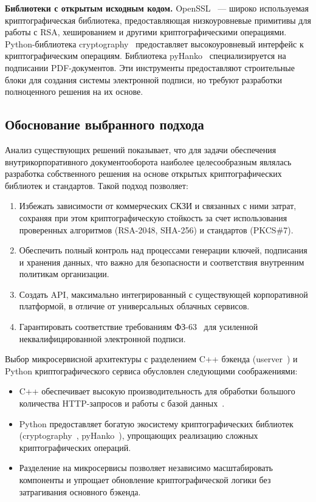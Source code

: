 \documentclass[a4paper,12pt]{extarticle}
\begin{document}
\textbf{Библиотеки с открытым исходным кодом.} OpenSSL~\cite{openssl} --- широко используемая криптографическая библиотека, предоставляющая низкоуровневые примитивы для работы с RSA, хешированием и другими криптографическими операциями. Python-библиотека cryptography~\cite{cryptography_python} предоставляет высокоуровневый интерфейс к криптографическим операциям. Библиотека pyHanko~\cite{pyhanko} специализируется на подписании PDF-документов. Эти инструменты предоставляют строительные блоки для создания системы электронной подписи, но требуют разработки полноценного решения на их основе.

\subsection{Обоснование выбранного подхода}

Анализ существующих решений показывает, что для задачи обеспечения внутрикорпоративного документооборота наиболее целесообразным являлась разработка собственного решения на основе открытых криптографических библиотек и стандартов. Такой подход позволяет:

\begin{enumerate}
    \item Избежать зависимости от коммерческих СКЗИ и связанных с ними затрат, сохраняя при этом криптографическую стойкость за счет использования проверенных алгоритмов (RSA-2048, SHA-256) и стандартов (PKCS\#7).

    \item Обеспечить полный контроль над процессами генерации ключей, подписания и хранения данных, что важно для безопасности и соответствия внутренним политикам организации.

    \item Создать API, максимально интегрированный с существующей корпоративной платформой, в отличие от универсальных облачных сервисов.

    \item Гарантировать соответствие требованиям ФЗ-63~\cite{fz63} для усиленной неквалифицированной электронной подписи.
\end{enumerate}

Выбор микросервисной архитектуры с разделением C++ бэкенда (userver~\cite{userver}) и Python криптографического сервиса обусловлен следующими соображениями:

\begin{itemize}
    \item C++ обеспечивает высокую производительность для обработки большого количества HTTP-запросов и работы с базой данных~\cite{postgresql}.

    \item Python предоставляет богатую экосистему криптографических библиотек (cryptography~\cite{cryptography_python}, pyHanko~\cite{pyhanko}), упрощающих реализацию сложных криптографических операций.

    \item Разделение на микросервисы позволяет независимо масштабировать компоненты и упрощает обновление криптографической логики без затрагивания основного бэкенда.
\end{itemize}
\end{document}
